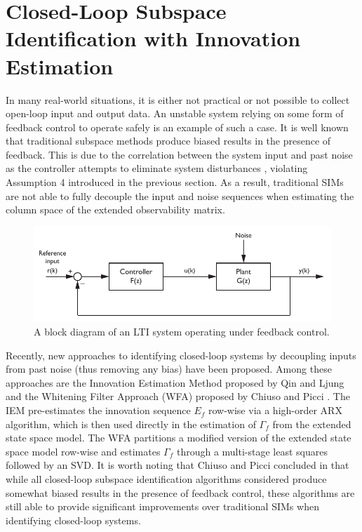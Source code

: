 \section{Closed-Loop Subspace Identification with Innovation Estimation}\label{sec:closed-loop_subspace_identification}
In many real-world situations, it is either not practical or not possible to collect open-loop input and output data. An unstable system relying on some form of feedback control to operate safely is an example of such a case. It is well known that traditional subspace methods produce biased results in the presence of feedback. This is due to the correlation between the system input and past noise as the controller attempts to eliminate system disturbances \cite{qin2006overview}, violating Assumption 4 introduced in the previous section. As a result, traditional SIMs are not able to fully decouple the input and noise sequences when estimating the column space of the extended observability matrix.
\begin{figure}[htb!]
	\centering
	\includegraphics{../fig/closed_loop_block_diagram.pdf}
	\caption{A block diagram of an LTI system operating under feedback control.}
\end{figure}

Recently, new approaches to identifying closed-loop systems by decoupling inputs from past noise (thus removing any bias) have been proposed. Among these approaches are the Innovation Estimation Method proposed by Qin and Ljung \cite{qin2003closed} and the Whitening Filter Approach (WFA) proposed by Chiuso and Picci \cite{chiuso2005consistency}. The IEM pre-estimates the innovation sequence $E_f$ row-wise via a high-order ARX algorithm, which is then used directly in the estimation of $\Gamma_f$ from the extended state space model. The WFA partitions a modified version of the extended state space model row-wise and estimates $\Gamma_f$ through a multi-stage least squares followed by an SVD\@. It is worth noting that Chiuso and Picci concluded in \cite{chiuso2005consistency} that while all closed-loop subspace identification algorithms considered produce somewhat biased results in the presence of feedback control, these algorithms are still able to provide significant improvements over traditional SIMs when identifying closed-loop systems.

